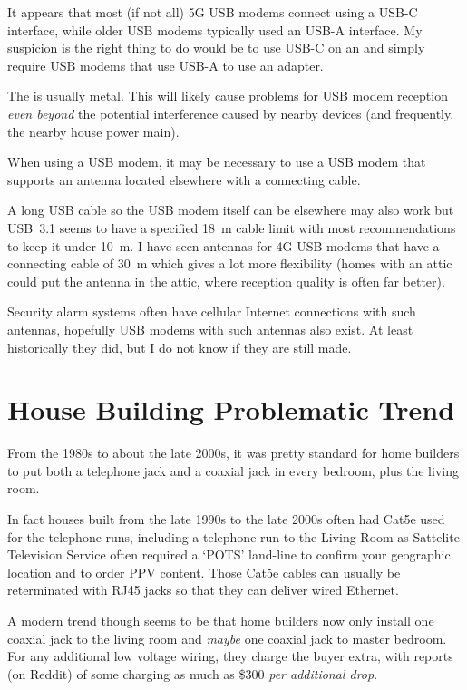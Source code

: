 It appears that most (if not all) 5G USB modems connect using a USB-C interface, while older USB modems typically
used an USB-A interface. My suspicion is the right thing to do would be to use USB-C on an 
and simply require USB modems that use USB-A to use an adapter.

The \tcab{} is usually metal. This will likely cause problems for USB modem
reception \emph{even beyond} the potential interference caused by nearby devices (and frequently, the nearby house
power main).

When using a USB modem, it may be necessary to use a USB modem that supports an antenna located elsewhere with a
connecting cable.

A long USB cable so the USB modem itself can be elsewhere may also work but USB~3.1 seems to have a specified
\qty{18}{\meter} cable limit with most recommendations to keep it under \qty{10}{\meter}. I have seen antennas for 4G
USB modems that have a connecting cable of \qty{30}{\meter} which gives a lot more flexibility (homes with an attic
could put the antenna in the attic, where reception quality is often far better).




Security alarm systems often have cellular Internet connections with such antennas, hopefully
USB modems with such antennas also exist. At least historically they did, but I do not know if they are still made.


\section{House Building Problematic Trend}

From the 1980s to about the late 2000s, it was pretty standard for home builders to put both a telephone jack
and a coaxial jack in every bedroom, plus the living room.

In fact houses built from the late 1990s to the late 2000s often had Cat5e used for the telephone runs, including
a telephone run to the Living Room as Sattelite Television Service often required a `POTS' land-line to confirm
your geographic location and to order PPV content. Those Cat5e cables can usually be reterminated with RJ45 jacks
so that they can deliver wired Ethernet.

A modern trend though seems to be that home builders now only install one coaxial jack to the living room and
\emph{maybe} one coaxial jack to master bedroom. For any additional low voltage wiring, they charge the buyer
extra, with reports (on Reddit) of some charging as much as \$300 \emph{per additional drop}.

